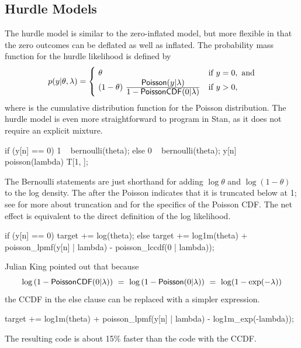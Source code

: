 \subsection{Hurdle Models}

The hurdle model is similar to the zero-inflated model, but more
flexible in that the zero outcomes can be deflated as well as
inflated.  The probability mass function for the hurdle likelihood is
defined by
%
\[
p(y|\theta,\lambda)
= 
\begin{cases}
\ \theta & \mbox{if } y = 0, \mbox{ and}
\\
\ (1 - \theta)
  \
   \frac{\displaystyle \distro{Poisson}(y | \lambda)}
        {\displaystyle \vspace*{8pt} 1 - \distro{PoissonCDF}(0 | \lambda)}
& \mbox{if } y > 0,
\end{cases}
\]
%
where  is the cumulative distribution function for
the Poisson distribution.  The hurdle model is even more straightforward to
program in Stan, as it does not require an explicit mixture.  
%
\begin{stancode}
   if (y[n] == 0)
      1 ~ bernoulli(theta);
    else {
      0 ~ bernoulli(theta);
      y[n] ~ poisson(lambda) T[1, ];
    }
\end{stancode}
%
The Bernoulli statements are just shorthand for adding $\log \theta$
and $\log (1 - \theta)$ to the log density.  The \code{T[1,]} after
the Poisson indicates that it is truncated below at 1; see
 for more about truncation and
 for the specifics of the Poisson CDF.  The net
effect is equivalent to the direct definition of the log likelihood.
%
\begin{stancode}
   if (y[n] == 0)
      target += log(theta);
    else
      target += log1m(theta) + poisson_lpmf(y[n] | lambda)
                - poisson_lccdf(0 | lambda));
\end{stancode}

Julian King pointed out that because
\[
\log \left( 1 - \distro{PoissonCDF}(0 | \lambda) \right)
\ = \ \log \left( 1 - \distro{Poisson}(0 | \lambda) \right) 
\ = \ \log(1 - \exp(-\lambda))
\]
the CCDF in the else clause can be replaced with a simpler expression.
%
\begin{stancode}
      target += log1m(theta) + poisson_lpmf(y[n] | lambda)
                - log1m_exp(-lambda));
\end{stancode}
%
The resulting code is about 15\% faster than the code with the CCDF.

